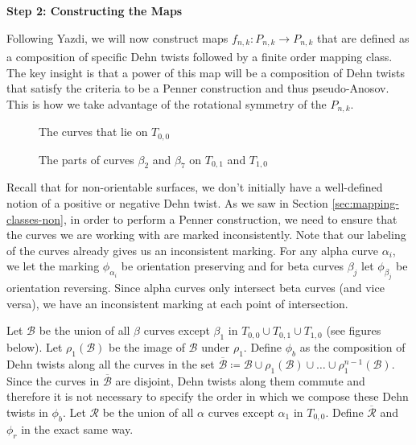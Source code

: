 \begin{center}
\textbf{Step 2: Constructing the Maps}
\end{center}


Following Yazdi, we will now construct maps $f_{n,k}: P_{n,k} \xrightarrow[]{} P_{n,k}$ that are defined as a
composition of specific Dehn twists followed by a finite order mapping class. The key insight is that a power
of this map will be a composition of Dehn twists that satisfy the criteria to be a Penner construction and
thus pseudo-Anosov. This is how we take advantage of the rotational symmetry of the $P_{n,k}$.

\begin{figure}[h]
    \centering
    \caption{The curves that lie on $T_{0,0}$}
    \label{fig:curves}
\end{figure}

\begin{figure}[h]
    \centering
    \caption{The parts of curves $\beta_2$ and $\beta_7$ on $T_{0,1}$ and $T_{1,0}$}
    \label{fig:extracurves}
\end{figure}

Recall that for non-orientable surfaces, we don't initially have a well-defined notion of a positive or
negative Dehn twist. As we saw in Section \ref{sec:mapping-classes-non}, in order to perform a Penner
construction, we need to ensure that the curves we are working with are marked inconsistently. Note that our
labeling of the curves already gives us an inconsistent marking. For any alpha curve $\alpha_i$, we let the
marking $\phi_{\alpha_i}$ be orientation preserving and for beta curves $\beta_j$ let $\phi_{\beta_j}$ be
orientation reversing. Since alpha curves only intersect beta curves (and vice versa), we have an inconsistent
marking at each point of intersection.

Let $\mathcal{B}$ be the union of all $\beta$ curves except $\beta_1$ in $T_{0,0} \cup T_{0,1} \cup T_{1,0}$
(see figures below). Let $\rho_1(\mathcal{B})$ be the image of $\mathcal{B}$ under $\rho_1$. Define $\phi_b$
as the composition of Dehn twists along all the curves in the set
$\overline{\mathcal{B}} \coloneqq \mathcal{B} \cup \rho_1(\mathcal{B}) \cup \dots \cup
\rho_1^{n-1}(\mathcal{B})$. Since the curves in $\overline{\mathcal{B}}$ are disjoint, Dehn twists along them
commute and therefore it is not necessary to specify the order in which we compose these Dehn twists in
$\phi_b$. Let $\mathcal{R}$ be the union of all $\alpha$ curves except $\alpha_1$ in $T_{0,0}$. Define
$\overline{\mathcal{R}}$ and $\phi_r$ in the exact same way.

